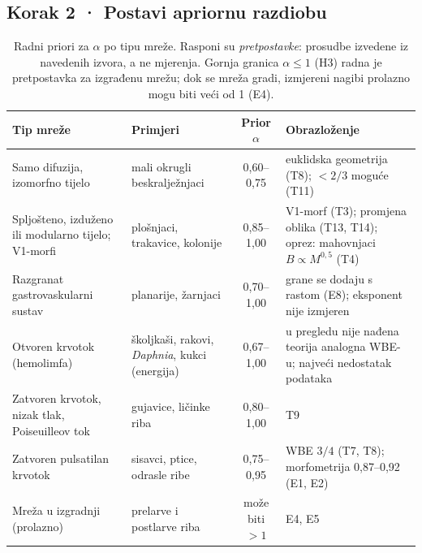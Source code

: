 \subsection*{Korak 2 · Postavi apriornu razdiobu}

\begin{table}[ht]
\centering\small
\caption{Radni priori za $\alpha$ po tipu mreže. Rasponi su \emph{pretpostavke}: prosudbe izvedene iz navedenih izvora, a ne mjerenja. Gornja granica $\alpha\le1$ (H3) radna je pretpostavka za izgrađenu mrežu; dok se mreža gradi, izmjereni nagibi prolazno mogu biti veći od 1 (E4).}
\label{tab:priori}
\begin{tabularx}{\linewidth}{@{}>{\raggedright\arraybackslash}p{4.3cm}>{\raggedright\arraybackslash}p{3.2cm}c>{\raggedright\arraybackslash}X@{}}
\toprule
Tip mreže & Primjeri & Prior $\alpha$ & Obrazloženje \\
\midrule
Samo difuzija, izomorfno tijelo & mali okrugli beskralježnjaci & 0,60–0,75 & euklidska geometrija (T8); $<2/3$ moguće (T11) \\
Spljošteno, izduženo ili modularno tijelo; V1-morfi & plošnjaci, trakavice, kolonije & 0,85–1,00 & V1-morf (T3); promjena oblika (T13, T14); oprez: mahovnjaci $B\propto M^{0{,}5}$ (T4) \\
Razgranat gastrovaskularni sustav & planarije, žarnjaci & 0,70–1,00 & grane se dodaju s rastom (E8); eksponent nije izmjeren \\
Otvoren krvotok (hemolimfa) & školjkaši, rakovi, \emph{Daphnia}, kukci (energija) & 0,67–1,00 & u pregledu nije nađena teorija analogna WBE-u; najveći nedostatak podataka \\
Zatvoren krvotok, nizak tlak, Poiseuilleov tok & gujavice, ličinke riba & 0,80–1,00 & T9 \\
Zatvoren pulsatilan krvotok & sisavci, ptice, odrasle ribe & 0,75–0,95 & WBE $3/4$ (T7, T8); morfometrija 0,87–0,92 (E1, E2) \\
Mreža u izgradnji (prolazno) & prelarve i postlarve riba & može biti $>1$ & E4, E5 \\
\bottomrule
\end{tabularx}
\end{table}

